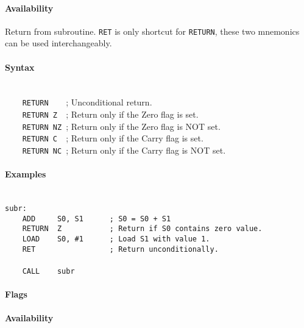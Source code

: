         \paragraph{Availability}
            \pbavailability{\yes}{\yes}{\yes}{\yes}{\yes}

    \clearpage
        Return from subroutine. \texttt{RET} is only shortcut for \texttt{RETURN}, these two mnemonics can be used interchangeably.

        \paragraph{Syntax}
            ~\\
            \verb'    RETURN    '; Unconditional return.\\
            \verb'    RETURN Z  '; Return only if the Zero flag is set.\\
            \verb'    RETURN NZ '; Return only if the Zero flag is NOT set.\\
            \verb'    RETURN C  '; Return only if the Carry flag is set.\\
            \verb'    RETURN NC '; Return only if the Carry flag is NOT set.

        \paragraph{Examples}
            ~\\
            \verb'subr:'\\
            \verb'    ADD     S0, S1      ; S0 = S0 + S1'\\
            \verb'    RETURN  Z           ; Return if S0 contains zero value.'\\
            \verb'    LOAD    S0, #1      ; Load S1 with value 1.'\\
            \verb'    RET                 ; Return unconditionally.'\\
            \verb''\\
            \verb'    CALL    subr'

        \paragraph{Flags}

        \paragraph{Availability}
            \pbavailability{\yes}{\yes}{\yes}{\yes}{\yes}

